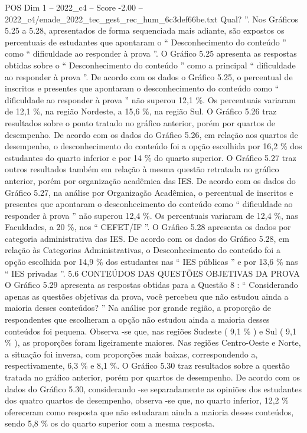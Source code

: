 \begin{textsample}{POS Dim 1 – 2022\_c4 – Score -2.00 – 2022\_c4/enade\_2022\_tec\_gest\_rec\_hum\_6c3def66be.txt}
Qual? ”.
Nos Gráficos 5.25 a 5.28, apresentados de forma sequenciada mais adiante, são expostos os percentuais de estudantes que apontaram o “ Desconhecimento do conteúdo ” como “ dificuldade ao responder à prova ”.
O Gráfico 5.25 apresenta as respostas obtidas sobre o “ Desconhecimento do conteúdo ” como a principal “ dificuldade ao responder à prova ”.
De acordo com os dados o Gráfico 5.25, o percentual de inscritos e presentes que apontaram o desconhecimento do conteúdo como “ dificuldade ao responder à prova ” não superou 12,1 \%.
Os percentuais variaram de 12,1 \%, na região Nordeste, a 15,6 \%, na região Sul.
O Gráfico 5.26 traz resultados sobre o ponto tratado no gráfico anterior, porém por quartos de desempenho.
De acordo com os dados do Gráfico 5.26, em relação aos quartos de desempenho, o desconhecimento do conteúdo foi a opção escolhida por 16,2 \% dos estudantes do quarto inferior e por 14 \% do quarto superior.
O Gráfico 5.27 traz outros resultados também em relação à mesma questão retratada no gráfico anterior, porém por organização acadêmica das IES.
De acordo com os dados do Gráfico 5.27, na análise por Organização Acadêmica, o percentual de inscritos e presentes que apontaram o desconhecimento do conteúdo como “ dificuldade ao responder à prova ” não superou 12,4 \%.
Os percentuais variaram de 12,4 \%, nas Faculdades, a 20 \%, nos “ CEFET/IF ”.
O Gráfico 5.28 apresenta os dados por categoria administrativa das IES.
De acordo com os dados do Gráfico 5.28, em relação às Categorias Administrativas, o Desconhecimento do conteúdo foi a opção escolhida por 14,9 \% dos estudantes nas “ IES públicas ” e por 13,6 \% nas “ IES privadas ”. 5.6 CONTEÚDOS DAS QUESTÕES OBJETIVAS DA PROVA O Gráfico 5.29 apresenta as respostas obtidas para a Questão 8 : “ Considerando apenas as questões objetivas da prova, você percebeu que não estudou ainda a maioria desses conteúdos? ” Na análise por grande região, a proporção de respondentes que escolheram a opção não estudou ainda a maioria desses conteúdos foi pequena.
Observa -se que, nas regiões Sudeste ( 9,1 \% ) e Sul ( 9,1 \% ), as proporções foram ligeiramente maiores.
Nas regiões Centro-Oeste e Norte, a situação foi inversa, com proporções mais baixas, correspondendo a, respectivamente, 6,3 \% e 8,1 \%.
O Gráfico 5.30 traz resultados sobre a questão tratada no gráfico anterior, porém por quartos de desempenho.
De acordo com os dados do Gráfico 5.30, considerando -se separadamente as opiniões dos estudantes dos quatro quartos de desempenho, observa -se que, no quarto inferior, 12,2 \% ofereceram como resposta que não estudaram ainda a maioria desses conteúdos, sendo 5,8 \% os do quarto superior com a mesma resposta.

\end{textsample}
